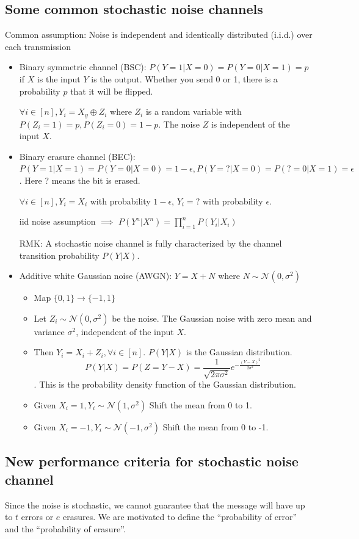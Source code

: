 \documentclass[letterpaper,12pt]{article}
\begin{document}
\subsection{Some common stochastic noise channels}
Common assumption: Noise is independent and identically distributed (i.i.d.) over each transmission\begin{itemize}
    \item Binary symmetric channel (BSC): $P(Y=1|X=0)=P(Y=0|X=1)=p$ if $X$ is the input $Y$ is the output. Whether you send 0 or 1, there is a probability $p$ that it will be flipped.
    
    $\forall i \in [n], Y_i = X_y \oplus Z_i$ where $Z_i$ is a random variable with $P(Z_i=1)=p, P(Z_i=0)=1-p$. The noise $Z$ is independent of the input $X$.
    \item Binary erasure channel (BEC): $P(Y=1|X=1)=P(Y=0|X=0)=1-\epsilon, P(Y=?|X=0)=P(?=0|X=1)=\epsilon$. Here ? means the bit is erased.
    
    $\forall i \in [n], Y_i = X_i$ with probability $1-\epsilon$, $Y_i=?$ with probability $\epsilon$.

    iid noise assumption $\implies$ $P(Y^n|X^n)=\prod_{i=1}^{n}P(Y_i|X_i)$

    RMK: A stochastic noise channel is fully characterized by the channel transition probability $P(Y|X)$.
    \item Additive white Gaussian noise (AWGN): $Y=X+N$ where $N\sim \mathcal{N}(0,\sigma^2)$\begin{itemize}
        \item Map $\{0,1\} \to \{-1,1\}$
        \item Let $Z_i\sim \mathcal{N}(0,\sigma^2)$ be the noise.  The Gaussian noise with zero mean and variance $\sigma^2$, independent of the input $X$.
        \item Then $Y_i=X_i+Z_i, \forall i\in[n]$. $P(Y|X)$ is the Gaussian distribution. \[P(Y|X)=P(Z=Y-X)=\frac{1}{\sqrt{2\pi\sigma^2}}e^{-\frac{(Y-X)^2}{2\sigma^2}}\]. This is the probability density function of the Gaussian distribution.
        \item Given $X_i=1, Y_i\sim \mathcal{N}(1,\sigma^2)$ Shift the mean from 0 to 1.
        \item Given $X_i=-1, Y_i\sim \mathcal{N}(-1,\sigma^2)$ Shift the mean from 0 to -1.
    \end{itemize}
\end{itemize}
\subsection{New performance criteria for stochastic noise channel}
Since the noise is stochastic, we cannot guarantee that the message will have up to $t$ errors or $e$ erasures. We are motivated to define the ``probability of error'' and the ``probability of erasure''.
\end{document}
